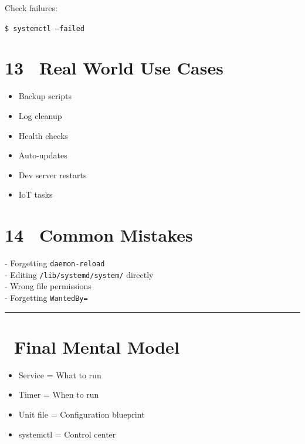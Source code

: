 \documentclass[12pt]{article}
\newcommand{\warningicon}{\faExclamationTriangle}
\begin{document}
Check failures:

\begin{highlightbox}
\texttt{\$ systemctl --failed}
\end{highlightbox}

\section*{13 \faGlobe\ Real World Use Cases}

\begin{itemize}
    \item Backup scripts
    \item Log cleanup
    \item Health checks
    \item Auto-updates
    \item Dev server restarts
    \item IoT tasks
\end{itemize}

\section*{14 \warningicon\ Common Mistakes}

\begin{warningbox}
- Forgetting \texttt{daemon-reload}\\
- Editing \texttt{/lib/systemd/system/} directly\\
- Wrong file permissions\\
- Forgetting \texttt{WantedBy=}
\end{warningbox}

\vspace{1em}
\begin{center}
\color{teamred}\rule{0.8\textwidth}{1pt}
\end{center}

\section*{\faBrain\ Final Mental Model}

\begin{itemize}
    \item Service = What to run
    \item Timer = When to run
    \item Unit file = Configuration blueprint
    \item systemctl = Control center
\end{itemize}
\end{document}
